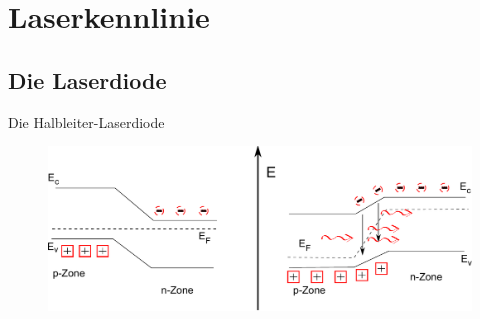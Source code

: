 \documentclass{beamer}
\begin{document}
\section{Laserkennlinie} %

\subsection{Die Laserdiode}

\begin{frame}
\begin{center}
\end{center}
\end{frame}

\begin{frame}{Die Halbleiter-Laserdiode} 
\begin{figure}
 \includegraphics[width=\textwidth]{Bilder/p-n.pdf}
\end{figure}

\end{frame}
\end{document}
